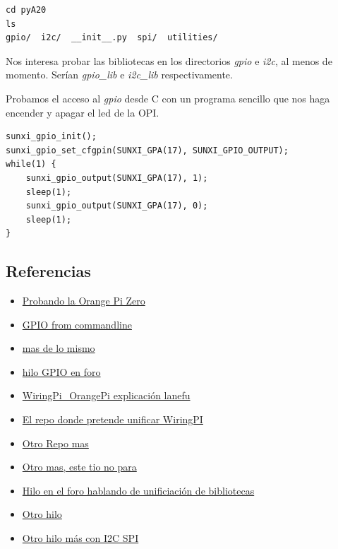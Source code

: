 \documentclass[12pt,spanish,]{scrartcl}
\providecommand{\tightlist}{%
  \setlength{\itemsep}{0pt}\setlength{\parskip}{0pt}}
\begin{document}
\begin{verbatim}
cd pyA20
ls
gpio/  i2c/  __init__.py  spi/  utilities/
\end{verbatim}

Nos interesa probar las bibliotecas en los directorios \emph{gpio} e
\emph{i2c}, al menos de momento. Serían \emph{gpio\_lib} e
\emph{i2c\_lib} respectivamente.

Probamos el acceso al \emph{gpio} desde C con un programa sencillo que
nos haga encender y apagar el led de la OPI.

\begin{verbatim}
sunxi_gpio_init();
sunxi_gpio_set_cfgpin(SUNXI_GPA(17), SUNXI_GPIO_OUTPUT);
while(1) {
    sunxi_gpio_output(SUNXI_GPA(17), 1);
    sleep(1);
    sunxi_gpio_output(SUNXI_GPA(17), 0);
    sleep(1);
}
\end{verbatim}

\subsection{Referencias}\label{referencias}

\begin{itemize}
\tightlist
\item
  \href{http://harald.studiokubota.com/wordpress/index.php/2016/11/19/orange-pi-zero-neat/}{Probando
  la Orange Pi Zero}
\item
  \href{http://falsinsoft.blogspot.com.es/2012/11/access-gpio-from-linux-user-space.html}{GPIO
  from commandline}
\item
  \href{http://www.emcraft.com/stm32f429discovery/controlling-gpio-from-linux-user-space}{mas
  de lo mismo}
\item
  \href{https://forum.armbian.com/index.php/topic/3084-orange-pi-zero-python-gpio-library/}{hilo
  GPIO en foro}
\item
  \href{https://gist.github.com/lanefu/f16a67195c9fa35c466c6b50cdaeadea}{WiringPi\_OrangePi
  explicación lanefu}
\item
  \href{https://github.com/lanefu/WiringOtherPi}{El repo donde pretende
  unificar WiringPI}
\item
  \href{https://github.com/lanefu/WiringPi-Python-OP}{Otro Repo mas}
\item
  \href{https://gist.github.com/lanefu/f16a67195c9fa35c466c6b50cdaeadea}{Otro
  mas, este tio no para}
\item
  \href{https://forum.armbian.com/index.php/topic/2956-559-gpio-support-for-h2h3-boards-with-a-unified-wiringpi-library-in-a-neat-little-package/\#entry20311}{Hilo
  en el foro hablando de unificiación de bibliotecas}
\item
  \href{https://forum.armbian.com/index.php/topic/3084-orange-pi-zero-python-gpio-library/?hl=\%2Bzero+\%2Bgpio+\%2Blibrary}{Otro
  hilo}
\item
  \href{https://forum.armbian.com/index.php/topic/3084-orange-pi-zero-python-gpio-library/}{Otro
  hilo más con I2C SPI}
\end{itemize}
\end{document}
